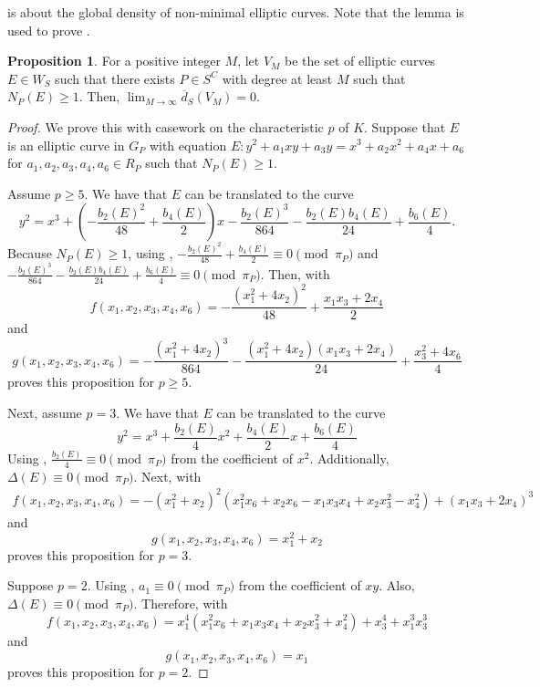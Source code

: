 \documentclass[12pt,letterpaper]{amsart}
\theoremstyle{definition}
\newtheorem{proposition}[theorem]{Proposition}
\begin{document}
 is about the global density of non-minimal elliptic curves. Note that the lemma is used to prove .

\begin{proposition}
\label{multitercond}
For a positive integer $M$, let $V_M$ be the set of elliptic curves $E\in W_S$ such that there exists $P\in S^C$ with degree at least $M$ such that $N_P(E)\geq 1$. Then, $\lim_{M\rightarrow\infty}\overline{d}_S(V_M)=0$.
\end{proposition}

\begin{proof}
We prove this with casework on the characteristic $p$ of $K$. Suppose that $E$ is an elliptic curve in $G_P$ with equation $E:y^2+a_1xy+a_3y=x^3+a_2x^2+a_4x+a_6$ for $a_1,a_2,a_3,a_4,a_6\in R_P$ such that $N_P(E)\geq 1$.

Assume $p\geq 5$. We have that $E$ can be translated to the curve
\[
y^2=x^3+\left(-\frac{b_2(E)^2}{48}+\frac{b_4(E)}{2}\right)x-\frac{b_2(E)^3}{864}-\frac{b_2(E)b_4(E)}{24}+\frac{b_6(E)}{4}.
\]
Because $N_P(E)\geq 1$, using , $-\frac{b_2(E)^2}{48}+\frac{b_4(E)}{2}\equiv 0\pmod{\pi_P}$ and $-\frac{b_2(E)^3}{864}-\frac{b_2(E)b_4(E)}{24}+\frac{b_6(E)}{4}\equiv 0\pmod{\pi_P}$. Then,  with 
\[
f(x_1,x_2,x_3,x_4,x_6)=-\frac{(x_1^2+4x_2)^2}{48}+\frac{x_1x_3+2x_4}{2}
\]
and 
\[
g(x_1,x_2,x_3,x_4,x_6)=-\frac{(x_1^2+4x_2)^3}{864}-\frac{(x_1^2+4x_2)(x_1x_3+2x_4)}{24}+\frac{x_3^2+4x_6}{4}
\]
proves this proposition for $p\geq 5$.

Next, assume $p=3$. We have that $E$ can be translated to the curve
\[
y^2=x^3+\frac{b_2(E)}{4}x^2+\frac{b_4(E)}{2}x+\frac{b_6(E)}{4}
\]
Using , $\frac{b_2(E)}{4}\equiv 0\pmod{\pi_P}$ from the coefficient of $x^2$. Additionally, $\Delta(E)\equiv 0\pmod{\pi_P}$. Next,  with \begin{align*}
f(x_1,x_2,x_3,x_4,x_6)= -(x_1^2+x_2)^2(x_1^2x_6+x_2x_6-x_1x_3x_4+x_2x_3^2-x_4^2)+(x_1x_3+2x_4)^3
\end{align*}
and 
\[
g(x_1,x_2,x_3,x_4,x_6)=x_1^2+x_2
\]
proves this proposition for $p=3$.

Suppose $p=2$. Using , $a_1\equiv 0\pmod{\pi_P}$ from the coefficient of $xy$. Also, $\Delta(E)\equiv 0\pmod{\pi_P}$. Therefore,  with 
\[
f(x_1,x_2,x_3,x_4,x_6)=x_1^4(x_1^2x_6+x_1x_3x_4+x_2x_3^2+x_4^2)+x_3^4+x_1^3x_3^3
\]
and 
\[
g(x_1,x_2,x_3,x_4,x_6)=x_1
\]
proves this proposition for $p=2$.
\end{proof}
\end{document}

